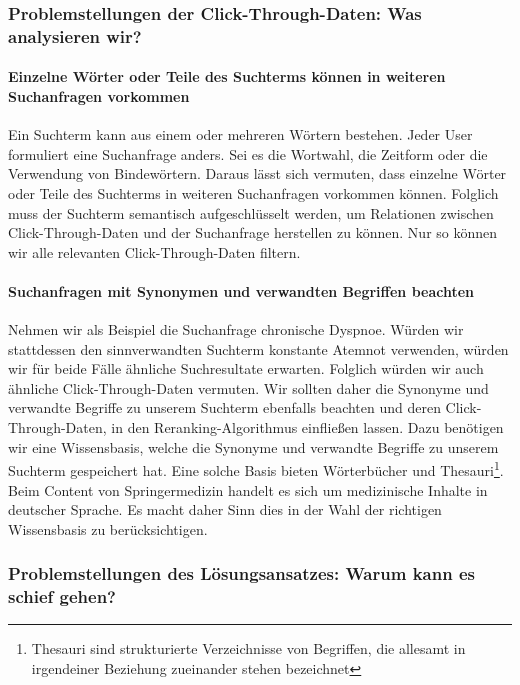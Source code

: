 \subsubsection{Problemstellungen der Click-Through-Daten: Was analysieren wir?}
\label{sec:Grundlagen:Grundbegriffe:SemantikUserInteraktionen:ProblemstellungenClick-Through-Daten}

\paragraph{Einzelne Wörter oder Teile des Suchterms können in weiteren Suchanfragen vorkommen}
Ein Suchterm kann aus einem oder mehreren Wörtern bestehen. Jeder User formuliert eine Suchanfrage anders. Sei es die Wortwahl, die Zeitform oder die Verwendung von Bindewörtern. Daraus lässt sich vermuten, dass einzelne Wörter oder Teile des Suchterms in weiteren Suchanfragen vorkommen können. Folglich muss der Suchterm semantisch aufgeschlüsselt werden, um Relationen zwischen Click-Through-Daten und der Suchanfrage herstellen zu können. Nur so können wir alle relevanten Click-Through-Daten filtern.

\paragraph{Suchanfragen mit Synonymen und verwandten Begriffen beachten}
Nehmen wir als Beispiel die Suchanfrage \glqq chronische Dyspnoe\grqq{}. Würden wir stattdessen den sinnverwandten Suchterm \glqq konstante Atemnot\grqq{} verwenden, würden wir für beide Fälle ähnliche Suchresultate erwarten. Folglich würden wir auch ähnliche Click-Through-Daten vermuten. Wir sollten daher die Synonyme und verwandte Begriffe zu unserem Suchterm ebenfalls beachten und deren Click-Through-Daten, in den Reranking-Algorithmus einfließen lassen. Dazu benötigen wir eine Wissensbasis, welche die Synonyme und verwandte Begriffe zu unserem Suchterm gespeichert hat. Eine solche Basis bieten Wörterbücher und Thesauri\footnote{Thesauri sind strukturierte Verzeichnisse von Begriffen, die allesamt in irgendeiner Beziehung zueinander stehen bezeichnet}. Beim Content von Springermedizin handelt es sich um medizinische Inhalte in deutscher Sprache. Es macht daher Sinn dies in der Wahl der richtigen Wissensbasis zu berücksichtigen.

\subsubsection{Problemstellungen des Lösungsansatzes: Warum kann es schief gehen?}
\label{sec:Grundlagen:Grundbegriffe:SemantikUserInteraktionen:ProblemstellungenLoesungsansatz} 

